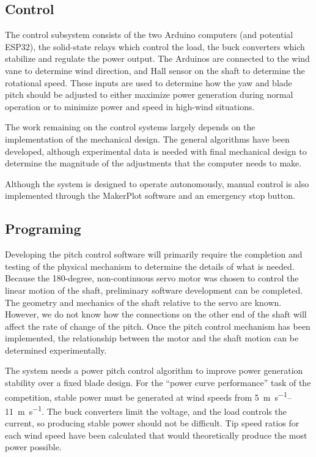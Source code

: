 \documentclass[11pt,letterpaper,conference]{IEEEtran}
\begin{document}
\subsection{Control}

The control subsystem consists of the two Arduino computers (and potential
ESP32), the solid-state relays which control the load, the buck converters
which stabilize and regulate the power output. The Arduinos are connected to
the wind vane to determine wind direction, and Hall sensor on the shaft to
determine the rotational speed. These inputs are used to determine how the
yaw and blade pitch should be adjusted to either maximize power generation
during normal operation or to minimize power and speed in high-wind situations.

The work remaining on the control systems largely depends on the implementation
of the mechanical design. The general algorithms have been developed, although
experimental data is needed with final mechanical design to determine the
magnitude of the adjustments that the computer needs to make.

Although the system is designed to operate autonomously, manual control is
also implemented through the MakerPlot software and an emergency stop button.


\subsection{Programing}

Developing the pitch control software will primarily require the completion and
testing of the physical mechanism to determine the details of what is needed.
Because the 180-degree, non-continuous servo motor was chosen to control the
linear motion of the shaft, preliminary software development can be completed.
The geometry and mechanics of the shaft relative to the servo are known.
However, we do not know how the connections on the other end of the shaft will
affect the rate of change of the pitch. Once the pitch control mechanism has
been implemented, the relationship between the motor and the shaft motion can
be determined experimentally.

The system needs a power pitch control algorithm to improve power generation
stability over a fixed blade design. For the ``power curve performance'' task
of the competition, stable power must be generated at wind speeds from
\qtyrange{5}{11}{\m\per\s}. The buck converters limit the voltage, and the load
controls the current, so producing stable power should not be difficult. Tip
speed ratios for each wind speed have been calculated that would theoretically
produce the most power possible.
\end{document}
